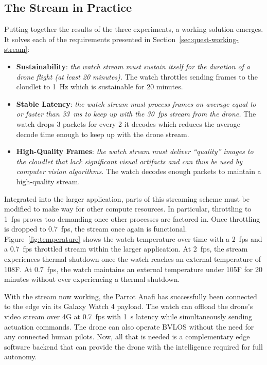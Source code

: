 \subsection{The Stream in Practice}
\label{sec:stream-in-practice}
Putting together the results of the three experiments, a working solution emerges. It solves each of the requirements presented in Section~\ref{sec:quest-working-stream}:
\begin{itemize}
    \item \textbf{Sustainability}: \textit{the watch stream must sustain itself for the duration of a drone flight (at least 20 minutes).}
    The watch throttles sending frames to the cloudlet to 1~Hz which is sustainable for 20 minutes.
    \item \textbf{Stable Latency}: \textit{the watch stream must process frames on average equal to or faster than 33~ms to keep up with the 30~fps stream from the drone.}
    The watch drops 3 packets for every 2 it decodes which reduces the average decode time enough to keep up with the drone stream.
    \item \textbf{High-Quality Frames}: \textit{the watch stream must deliver ``quality'' images to the cloudlet that lack significant visual artifacts and can thus be used by computer vision algorithms.}
    The watch decodes enough packets to maintain a high-quality stream.
\end{itemize}
Integrated into the larger application, parts of this streaming scheme must be modified to make way for other compute resources. In particular, throttling to 1~fps proves too demanding once other processes are factored in. Once throttling is dropped to 0.7~fps, the stream once again is functional. Figure~\ref{fig:temperature} shows the watch temperature over time with a 2~fps and a 0.7~fps throttled stream within the larger application. At 2~fps, the stream experiences thermal shutdown once the watch reaches an external temperature of 108\degree F. At 0.7~fps, the watch maintains an external temperature under 105\degree F for 20 minutes without ever experiencing a thermal shutdown.

With the stream now working, the Parrot Anafi has successfully been connected to the edge via its Galaxy Watch 4 payload. The watch can offload the drone's video stream over 4G at 0.7~fps with 1~s latency while simultaneously sending actuation commands. The drone can also operate BVLOS without the need for any connected human pilots. Now, all that is needed is a complementary edge software backend that can provide the drone with the intelligence required for full autonomy.

